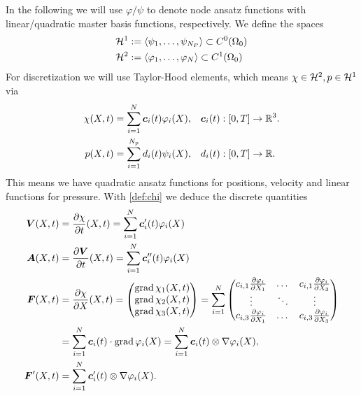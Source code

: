 In the following we will use $\varphi/\psi$ to denote node ansatz functions with linear/quadratic master basis functions, respectively.
We define the spaces
\begin{align*}
	\mathcal{H}^1 &:= \langle \psi_1,\ldots,\psi_{N_P} \rangle \subset C^0(\Omega_0)\\
	\mathcal{H}^2 &:= \langle \varphi_1,\ldots,\varphi_N \rangle \subset C^1(\Omega_0)
\end{align*} 
For discretization we will use Taylor-Hood elements, which means $\chi\in\mathcal{H}^2, p\in\mathcal{H}^1$ via
\begin{align}
	\chi(X,t) &= \sum\limits_{i=1}^{N} \boldsymbol{c}_i(t)\varphi_i(X), && \boldsymbol{c}_i(t):[0,T] \to\mathbb{R}^3.\label{def:chi}\\
	p(X,t) &= \sum\limits_{i=1}^{N_p} d_i(t)\psi_i(X), && d_i(t):[0,T] \to\mathbb{R}.
\end{align}
This means we have quadratic ansatz functions for positions, velocity and linear functions for pressure.
With \eqref{def:chi} we deduce the discrete quantities
\begin{align*}
	\boldsymbol{V}(X,t) &= \frac{\partial \chi}{\partial t}(X,t) = \sum\limits_{i=1}^{N} \boldsymbol{c}_i'(t)\varphi_i(X)\\
	\boldsymbol{A}(X,t) &= \frac{\partial \boldsymbol{V}}{\partial t}(X,t) = \sum\limits_{i=1}^{N} \boldsymbol{c}_i''(t)\varphi_i(X)\\
	\boldsymbol{F}(X,t) &= \frac{\partial \chi}{\partial X}(X,t) = \left(\begin{matrix}\operatorname{grad} \chi_1(X,t)\\ \operatorname{grad} \chi_2(X,t)\\ \operatorname{grad} \chi_3(X,t)\end{matrix}\right)
		   = \sum\limits_{i=1}^{N}\left(\begin{matrix}c_{i,1}\frac{\partial \varphi_i}{\partial X_1} & \dots & c_{i,1}\frac{\partial \varphi_i}{\partial X_3}\\
		   				\vdots & \ddots & \vdots\\
		   				c_{i,3}\frac{\partial \varphi_i}{\partial X_1} & \dots & c_{i,3}\frac{\partial \varphi_i}{\partial X_3}\end{matrix}\right)\\
		   &=\sum\limits_{i=1}^{N} \boldsymbol{c}_i(t)\cdot \operatorname{grad}\varphi_i(X) = \sum\limits_{i=1}^{N} \boldsymbol{c}_i(t)\otimes \nabla\varphi_{i}(X),\\
	\boldsymbol{F}'(X,t) &= \sum\limits_{i=1}^{N} \boldsymbol{c}'_i(t)\otimes \nabla\varphi_{i}(X).
\end{align*}

